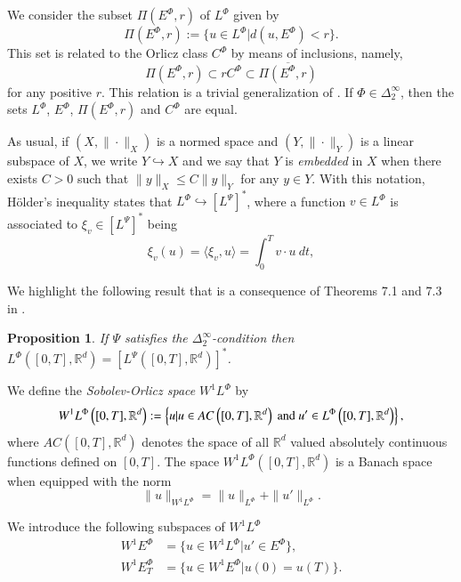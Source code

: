 \documentclass[twoside]{article}
\newtheorem{prop}[thm]{Proposition}
\theoremstyle{remark}
\newcommand{\orlnor}{\|_{L^{\Phi}}}
\newcommand{\lphi}{L^{\Phi}}
\newcommand{\lpsi}{L^{\Psi}}
\newcommand{\ephi}{E^{\Phi}}
\newcommand{\claseor}{C^{\Phi}}
\newcommand{\wphi}{W^{1}\lphi}
\newcommand{\wphie}{W^{1}\ephi}
\newcommand{\rr}{\mathbb{R}}
\renewcommand{\leq}{\leqslant}
\begin{document}
We consider the subset $\Pi(\ephi,r)$ of $\lphi$ given by
\[\Pi(\ephi,r):=\{u\in\lphi| d(u,\ephi)<r\}.\]
This set is related to the Orlicz class $\claseor$ by means of inclusions, namely,
\begin{equation}\label{eq:inclusiones}\Pi(\ephi, r )\subset r \claseor\subset\overline{\Pi(\ephi,r)}
\end{equation}
for any positive $r$. This relation is a trivial generalization of  \cite[Thm. 5.6]{Orliczvectorial2005}.
If $\Phi \in \Delta_2^{\infty}$,  then the sets $\lphi$, $\ephi$, $\Pi(\ephi,r)$ and $\claseor$ are equal.
 
As usual, if $(X,\|\cdot\|_X)$ is a normed space and $(Y,\|\cdot \|_Y)$ is a linear subspace of $X$,  we write $Y\hookrightarrow X$ and we say that $Y$ is \emph{embedded} in $X$  when there exists $C>0$ such that
$\|y\|_X\leq C\|y\|_Y$ for any $y\in Y$.  With this notation, H\"older's inequality states that  $\lphi\hookrightarrow  \left[\lpsi\right]^*$, where a function $v\in\lphi$ is associated  to $\xi_v\in \left[\lpsi\right]^*$ being
\begin{equation}\label{pairing}
  \xi_v(u)=\langle \xi_v,u\rangle=\int_0^Tv\cdot u\ dt,
\end{equation}

We highlight the following result that is a consequence of Theorems 7.1 and 7.3 in  \cite{Orliczvectorial2005}.

\begin{prop} If $\Psi$ satisfies the $\Delta_2^{\infty}$-condition then $\lphi\left([0,T],\rr^d\right)=\left[\lpsi\left([0,T],\rr^d\right)\right]^*$.  
 
\end{prop}







We define the \emph{Sobolev-Orlicz space} $\wphi$ by
\[\wphi\left([0,T],\rr^d\right):=\left\{u| u\in AC\left([0,T],\rr^d\right) \hbox{ and } u'\in \lphi\left([0,T],\rr^d\right)\right\},\]
where $AC\left([0,T],\rr^d\right)$ denotes the space of all $\rr^d$ valued absolutely continuous functions defined on $[0,T]$. The space $\wphi\left([0,T],\rr^d\right)$ is a Banach space when equipped with the norm
\begin{equation}\label{def-norma-orlicz-sob}
\|  u  \|_{\wphi}= \|  u  \|_{\lphi} + \|u'\orlnor.
\end{equation}

We introduce the following subspaces of $\wphi$
\begin{equation}\label{def-esp-orlicz-sob-per}
\begin{split}
\wphie&=\{u\in\wphi|u'\in\ephi\},\\
\wphie_T&=\{u\in\wphie|u(0)=u(T)\}.
\end{split}
\end{equation}
\end{document}
